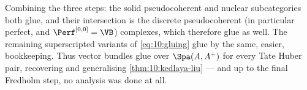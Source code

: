 \begin{remark}[Conclusion]
\label{rmk:10:conclusion}
Combining the three steps: the solid pseudocoherent and nuclear subcategories both
glue, and their intersection is the discrete pseudocoherent (in particular
perfect, and $\Perf^{[0,0]}=\VB$) complexes, which therefore glue as well. The
remaining superscripted variants of \eqref{eq:10:gluing} glue by the same, easier,
bookkeeping. Thus vector bundles glue over $\Spa(A,A^{+})$ for every Tate Huber
pair, recovering and generalising \cref{thm:10:kedlaya-liu} --- and up to the
final Fredholm step, no analysis was done at all.
\end{remark}
